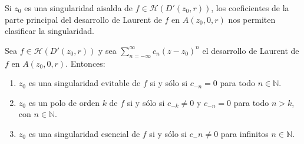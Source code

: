
Si $z_0$ es una singularidad aisalda de $f \in \mathcal{H}(D'(z_0, r))$, los coeficientes de la parte principal del desarrollo de Laurent de $f$ en $A(z_0, 0, r)$ nos permiten clasificar la singularidad.

\begin{proposición}
    Sea $f \in \mathcal{H}(D'(z_0, r))$ y sea $\sum_{n=-\infty}^{\infty} c_n (z - z_0)^n$ el desarrollo de Laurent de $f$ en $A(z_0, 0, r)$. Entonces:
    \begin{enumerate}
        \item $z_0$ es una singularidad evitable de $f$ si y sólo si $c_{-n} = 0$ para todo $n \in \mathbb{N}$.
        \item $z_0$ es un polo de orden $k$ de $f$ si y sólo si $c_{-k} \neq 0$ y $c_{-n} = 0$ para todo $n > k$, con $n \in \mathbb{N}$.
        \item $z_0$ es una singularidad esencial de $f$ si y sólo si $c_-n \neq 0$ para infinitos $n \in \mathbb{N}$.
    \end{enumerate}
\end{proposición}

